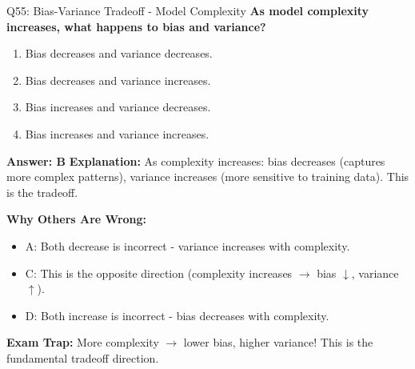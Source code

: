 \documentclass[8pt]{beamer}
\begin{document}
	\begin{frame}{Q55: Bias-Variance Tradeoff - Model Complexity}
		\fontsize{6.5}{7.5}\selectfont
		\textbf{As model complexity increases, what happens to bias and variance?}
		
		\begin{enumerate}
			\item Bias decreases and variance decreases.
			\item Bias decreases and variance increases.
			\item Bias increases and variance decreases.
			\item Bias increases and variance increases.
		\end{enumerate}
		
		\vspace{0.05cm}
		\textcolor{myblue}{\textbf{Answer: B}}
		\vspace{0.05cm}
		\textcolor{myblue}{\textbf{Explanation:}} As complexity increases: bias decreases (captures more complex patterns), variance increases (more sensitive to training data). This is the tradeoff.
		
		\vspace{0.05cm}
		\textcolor{myred}{\textbf{Why Others Are Wrong:}}
		\begin{itemize}
			\item \textcolor{myred}{A:} Both decrease is incorrect - variance increases with complexity.
			\item \textcolor{myred}{C:} This is the opposite direction (complexity increases $\to$ bias $\downarrow$, variance $\uparrow$).
			\item \textcolor{myred}{D:} Both increase is incorrect - bias decreases with complexity.
		\end{itemize}
		
		\textcolor{myred}{\textbf{Exam Trap:}} More complexity $\rightarrow$ \textcolor{myblue}{lower bias, higher variance}! This is the fundamental tradeoff direction.
	\end{frame}
	
\end{document}
